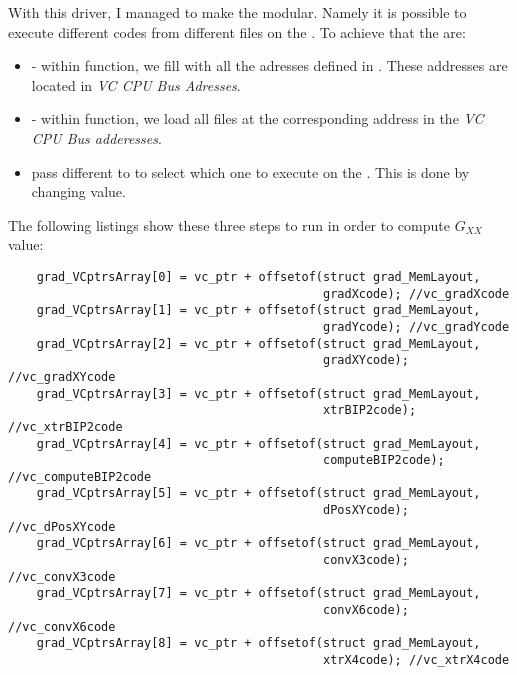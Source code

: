 With this driver, I managed to make the \api{} modular. Namely it is possible to execute different codes from different  files on the \vc.
To achieve that the  are:

\begin{itemize}
	\item {} - within  function, we fill  with all the adresses defined in . These addresses are located in \emph{VC CPU Bus Adresses}.
	\item {} - within  function, we load all  files at the corresponding address in the \emph{VC CPU Bus adderesses}.
	\item pass different   to  to select which one to execute on the \vc. This is done by changing  value.
\end{itemize}

The following listings show these three steps to run  in order to compute $G_{XX}$ value:

\begin{lstlisting}
    grad_VCptrsArray[0] = vc_ptr + offsetof(struct grad_MemLayout,
                                            gradXcode); //vc_gradXcode
    grad_VCptrsArray[1] = vc_ptr + offsetof(struct grad_MemLayout,
                                            gradYcode); //vc_gradYcode
    grad_VCptrsArray[2] = vc_ptr + offsetof(struct grad_MemLayout,
                                            gradXYcode); //vc_gradXYcode
    grad_VCptrsArray[3] = vc_ptr + offsetof(struct grad_MemLayout,
                                            xtrBIP2code); //vc_xtrBIP2code
    grad_VCptrsArray[4] = vc_ptr + offsetof(struct grad_MemLayout,
                                            computeBIP2code); //vc_computeBIP2code
    grad_VCptrsArray[5] = vc_ptr + offsetof(struct grad_MemLayout,
                                            dPosXYcode); //vc_dPosXYcode
    grad_VCptrsArray[6] = vc_ptr + offsetof(struct grad_MemLayout,
                                            convX3code); //vc_convX3code
    grad_VCptrsArray[7] = vc_ptr + offsetof(struct grad_MemLayout,
                                            convX6code); //vc_convX6code
    grad_VCptrsArray[8] = vc_ptr + offsetof(struct grad_MemLayout,
                                            xtrX4code); //vc_xtrX4code
\end{lstlisting}


